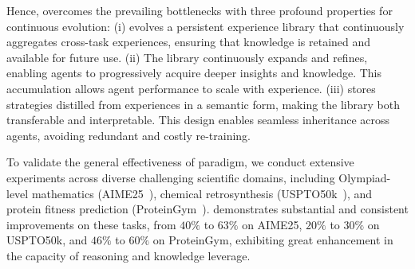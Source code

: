 Hence, \method{} overcomes the prevailing bottlenecks with three profound properties for continuous evolution: 
(i) \method{} evolves a persistent experience library that continuously aggregates cross-task experiences, ensuring that knowledge is retained and available for future use.
(ii) The library continuously expands and refines, enabling agents to progressively acquire deeper insights and knowledge. This accumulation allows agent performance to scale with experience.
(iii) \method{} stores strategies distilled from experiences in a semantic form, making the library both transferable and interpretable. This design enables seamless inheritance across agents, avoiding redundant and costly re-training.

To validate the general effectiveness of \method{} paradigm, we conduct extensive experiments across diverse challenging scientific domains, including Olympiad-level mathematics (AIME25~\cite{aime2025problems}), chemical retrosynthesis (USPTO50k~\cite{schneider2016s}), and protein fitness prediction (ProteinGym~\cite{notin2023proteingym}). \method{} demonstrates substantial and consistent improvements on these tasks, from $40\%$ to $63\%$ on AIME25, $20\%$ to $30\%$ on USPTO50k, and $46\%$ to $60\%$ on ProteinGym, exhibiting great enhancement in the capacity of reasoning and knowledge leverage. 

